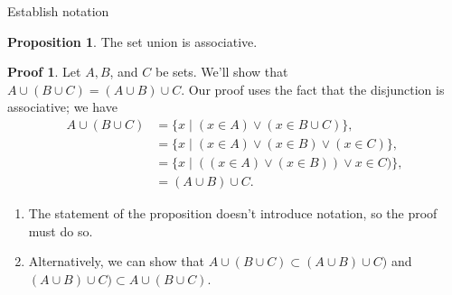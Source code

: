 \documentclass[fleqn]{beamer}
\theoremstyle{definition}
\newtheorem{myth}{Proposition}
\newtheorem{myproof}{Proof}
\newenvironment{checklist}{
  \begin{enumerate}[\ding{51}]
    \addtolength{\itemsep}{-0.0\itemsep}}
  {\end{enumerate}}
\begin{document}
\begin{frame}{Establish notation}

\begin{myth} The set union is associative. \end{myth}

\begin{myproof}  Let \(A,B\), and \(C\) be sets.  We'll show that \(A \cup (B \cup C) = (A \cup B) \cup C\).   Our proof uses the fact that
the disjunction is associative; we have
\begin{align*}
A \cup (B \cup C) &= \{x \mid (x \in A) \lor (x \in B \cup C) \}, \\
                                &= \{x \mid (x \in A) \lor (x \in B)  \lor  (x \in  C) \}, \\
                                            &= \{x \mid   ((x \in A) \lor  (x \in B))   \lor x \in C) \}, \\
                                &= (A \cup B) \cup C.
 \end{align*}
  \end{myproof}

  \begin{checklist}

  \item The statement of the proposition doesn't introduce notation, so the proof must do so.

  \item Alternatively, we can show that   \(  A \cup (B \cup C)  \subset  (A \cup B) \cup C) \) and  \( (A \cup B) \cup C) \subset A \cup (B \cup C)\).

  \end{checklist}

\end{frame}
\end{document}
